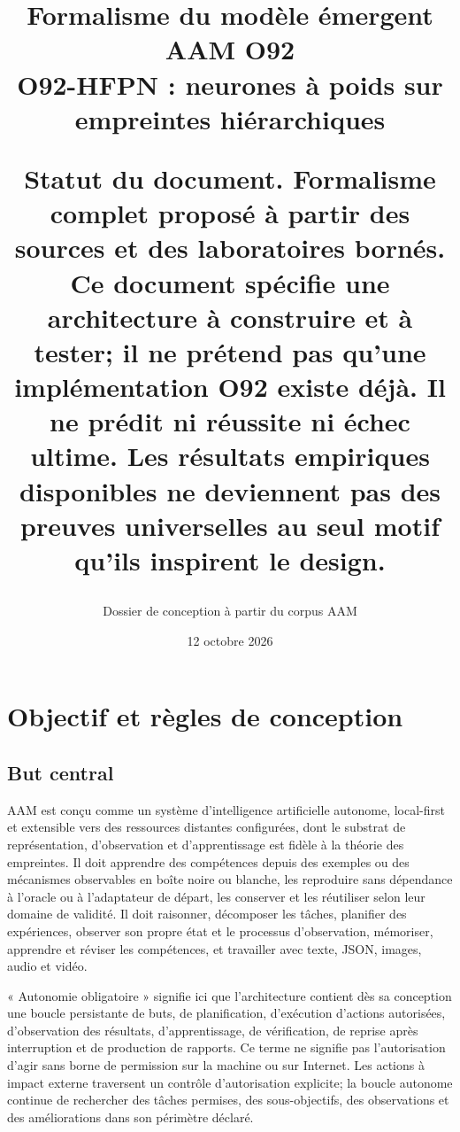 \documentclass[11pt,a4paper]{report}
\title{Formalisme du modèle émergent AAM O92\\[0.6em]\large O92-HFPN : neurones à poids sur empreintes hiérarchiques\\[1.2em]\normalfont\normalsize\begin{minipage}{0.82\textwidth}\textbf{Statut du document.} Formalisme complet proposé à partir des sources et des laboratoires bornés. Ce document spécifie une architecture à construire et à tester; il ne prétend pas qu'une implémentation O92 existe déjà. Il ne prédit ni réussite ni échec ultime. Les résultats empiriques disponibles ne deviennent pas des preuves universelles au seul motif qu'ils inspirent le design.\end{minipage}}
\author{Dossier de conception à partir du corpus AAM}
\date{12 octobre 2026}
\begin{document}
\maketitle
\tableofcontents
\chapter{Objectif et règles de conception}

\section{But central}
AAM est conçu comme un système d'intelligence artificielle autonome, local-first et extensible vers des ressources distantes configurées, dont le substrat de représentation, d'observation et d'apprentissage est fidèle à la théorie des empreintes. Il doit apprendre des compétences depuis des exemples ou des mécanismes observables en boîte noire ou blanche, les reproduire sans dépendance à l'oracle ou à l'adaptateur de départ, les conserver et les réutiliser selon leur domaine de validité. Il doit raisonner, décomposer les tâches, planifier des expériences, observer son propre état et le processus d'observation, mémoriser, apprendre et réviser les compétences, et travailler avec texte, JSON, images, audio et vidéo.

« Autonomie obligatoire » signifie ici que l'architecture contient dès sa conception une boucle persistante de buts, de planification, d'exécution d'actions autorisées, d'observation des résultats, d'apprentissage, de vérification, de reprise après interruption et de production de rapports. Ce terme ne signifie pas l'autorisation d'agir sans borne de permission sur la machine ou sur Internet. Les actions à impact externe traversent un contrôle d'autorisation explicite; la boucle autonome continue de rechercher des tâches permises, des sous-objectifs, des observations et des améliorations dans son périmètre déclaré.
\end{document}
